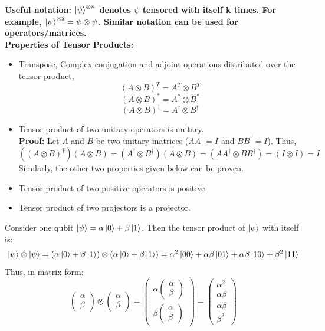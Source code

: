 \textbf{Useful notation: $\ket{\psi}^{\otimes n}$ denotes $\psi$ tensored with itself k times. For example, $\ket{\psi}^{\otimes 2} = \psi \otimes \psi$. Similar notation can be used for operators/matrices.}
\\
\textbf{Properties of Tensor Products: }
\begin{itemize}
    \item Transpose, Complex conjugation and adjoint operations distributed over the tensor product,
    \[ (A \otimes B)^T = A^T \otimes B^T \]
    \[ (A \otimes B)^{*}=A^{*} \otimes B^{*} \]
    \[ (A \otimes B)^{\dagger}=A^{\dagger} \otimes B^{\dagger} \]
    \item Tensor product of two unitary operators is unitary.\\
    \textbf{Proof: }Let $A$ and $B$ be two unitary matrices ($AA^{\dagger}=I$ and $BB^{\dagger}=I$). Thus,
    \[
    ((A\otimes B)^{\dagger})(A \otimes B)=(A^{\dagger} \otimes B^{\dagger})(A \otimes B) = (AA^{\dagger} \otimes BB^{\dagger})=(I \otimes I)= I
    \]
    Similarly, the other two properties given below can be proven.
    \item Tensor product of two positive operators is positive.
    \item Tensor product of two projectors is a projector.
\end{itemize}
\begin{example}
    Consider one qubit $\ket{\psi}=\alpha \ket{0} + \beta \ket{1}$. Then the tensor product of $\ket{\psi}$ with itself is:
    \[ \ket{\psi} \otimes \ket{\psi} = (\alpha \ket{0} + \beta \ket{1}) \otimes (\alpha \ket{0} + \beta \ket{1}) = \alpha^2 \ket{00} + \alpha \beta \ket{01} + \alpha \beta \ket{10} + \beta^2 \ket{11} \]
    Thus, in matrix form:
    \[ \begin{pmatrix} \alpha \\ \beta \end{pmatrix} \otimes \begin{pmatrix} \alpha \\ \beta \end{pmatrix} = \begin{pmatrix} \alpha \begin{pmatrix} \alpha \\ \beta \end{pmatrix} \\ \beta \begin{pmatrix} \alpha \\ \beta \end{pmatrix} \end{pmatrix} = \begin{pmatrix} \alpha^2 \\ \alpha \beta \\ \alpha \beta \\ \beta^2 \end{pmatrix} \]
\end{example}

